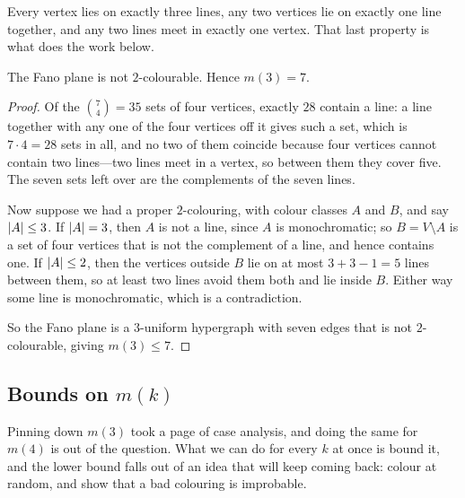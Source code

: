Every vertex lies on exactly three lines, any two vertices lie on exactly one line together, and any two lines meet in exactly one vertex. That last property is what does the work below.

\begin{boxproposition}
    The Fano plane is not $2$-colourable. Hence $m(3) = 7$.
\end{boxproposition}
\begin{proof}
    Of the $\binom{7}{4} = 35$ sets of four vertices, exactly $28$ contain a line: a line together with any one of the four vertices off it gives such a set, which is $7 \cdot 4 = 28$ sets in all, and no two of them coincide because four vertices cannot contain two lines---two lines meet in a vertex, so between them they cover five. The seven sets left over are the complements of the seven lines.

    Now suppose we had a proper $2$-colouring, with colour classes $A$ and $B$, and say $\left\lvert A \right\rvert \leq 3$. If $\left\lvert A \right\rvert = 3$, then $A$ is not a line, since $A$ is monochromatic; so $B = V \setminus A$ is a set of four vertices that is not the complement of a line, and hence contains one. If $\left\lvert A \right\rvert \leq 2$, then the vertices outside $B$ lie on at most $3 + 3 - 1 = 5$ lines between them, so at least two lines avoid them both and lie inside $B$. Either way some line is monochromatic, which is a contradiction.

    So the Fano plane is a $3$-uniform hypergraph with seven edges that is not $2$-colourable, giving $m(3) \leq 7$.
\end{proof}

\subsection{Bounds on $m(k)$}

Pinning down $m(3)$ took a page of case analysis, and doing the same for $m(4)$ is out of the question. What we can do for every $k$ at once is bound it, and the lower bound falls out of an idea that will keep coming back: colour at random, and show that a bad colouring is improbable.

